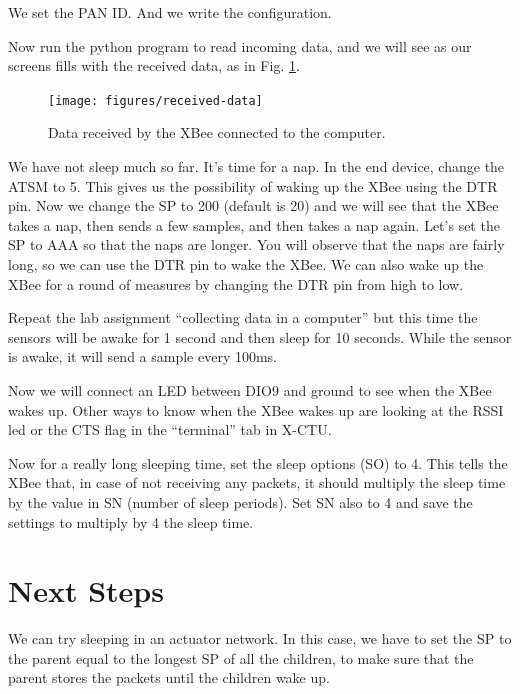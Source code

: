 We set the PAN ID.
And we write the configuration.

Now run the python program to read incoming data, and we will see as our screens fills with the received data, as in Fig. \ref{fig:received-data}.

\begin{figure}[htbp]
  \centering
  \texttt{[image: figures/received-data]}
  \caption{Data received by the XBee connected to the computer.}
  \label{fig:received-data}
\end{figure}

We have not sleep much so far.
It's time for a nap.
In the end device, change the ATSM to 5.
This gives us the possibility of waking up the XBee using the DTR pin.
Now we change the SP to 200 (default is 20) and we will see that the XBee takes a nap, then sends a few samples, and then takes a nap again.
Let's set the SP to AAA so that the naps are longer.
You will observe that the naps are fairly long, so we can use the DTR pin to wake the XBee.
We can also wake up the XBee for a round of measures by changing the DTR pin from high to low.

Repeat the lab assignment ``collecting data in a computer'' but this time the sensors will be awake for 1 second and then sleep for 10 seconds.
While the sensor is awake, it will send a sample every 100ms.

Now we will connect an LED between DIO9 and ground to see when the XBee wakes up.
Other ways to know when the XBee wakes up are looking at the RSSI led or the CTS flag in the ``terminal'' tab in X-CTU.

Now for a really long sleeping time, set the sleep options (SO) to 4.
This tells the XBee that, in case of not receiving any packets, it should multiply the sleep time by the value in SN (number of sleep periods).
Set SN also to 4 and save the settings to multiply by 4 the sleep time.

\section{Next Steps}
We can try sleeping in an actuator network.
In this case, we have to set the SP to the parent equal to the longest SP of all the children, to make sure that the parent stores the packets until the children wake up.
